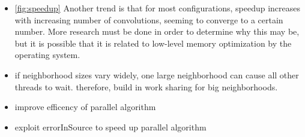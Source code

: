 \begin{itemize}
	\item \ref{fig:speedup} Another trend is that for most configurations, speedup increases with increasing number of convolutions, seeming to converge to a certain number. More research must be done in order to determine why this may be, but it is possible that it is related to low-level memory optimization by the operating system.
	\item if neighborhood sizes vary widely, one large neighborhood can cause all other threads to wait. therefore, build in work sharing for big neighborhoods.
	\item improve efficency of parallel algorithm
	\item exploit errorInSource to speed up parallel algorithm
\end{itemize}

